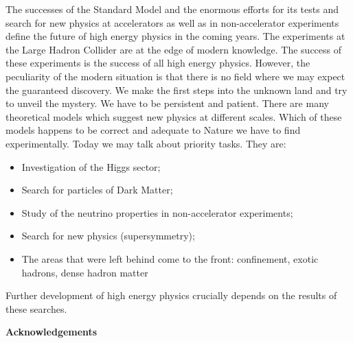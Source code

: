 \documentclass{cernyrep}
\begin{document}
The successes of the Standard Model and the enormous efforts for its tests and search for new physics at accelerators as well as in non-accelerator experiments define the future of high energy physics in the coming years. The experiments at the Large Hadron Collider are at the edge of modern knowledge. The success of these experiments is the success of all high energy physics. However, the peculiarity of the modern situation is that there is no field where we may expect the guaranteed discovery. We make the first steps into the unknown land and try to unveil the mystery. We have to be persistent and patient. There are many theoretical models which suggest new physics at different scales. Which of these models happens to be correct and adequate to Nature we have to find experimentally. Today we may talk about priority tasks. They are:
\begin{itemize}
 \item Investigation of the Higgs sector;
\item  Search for particles of Dark Matter;
\item  Study of  the neutrino properties in non-accelerator experiments;
\item Search for new physics (supersymmetry);
\item The areas that were left behind come to the front:  confinement, exotic hadrons, dense hadron matter
\end{itemize}
Further development of high energy physics crucially depends on the results of these searches.


\vspace{0.3cm} {\large \bf Acknowledgements} \vspace{0.1cm}
\end{document}
